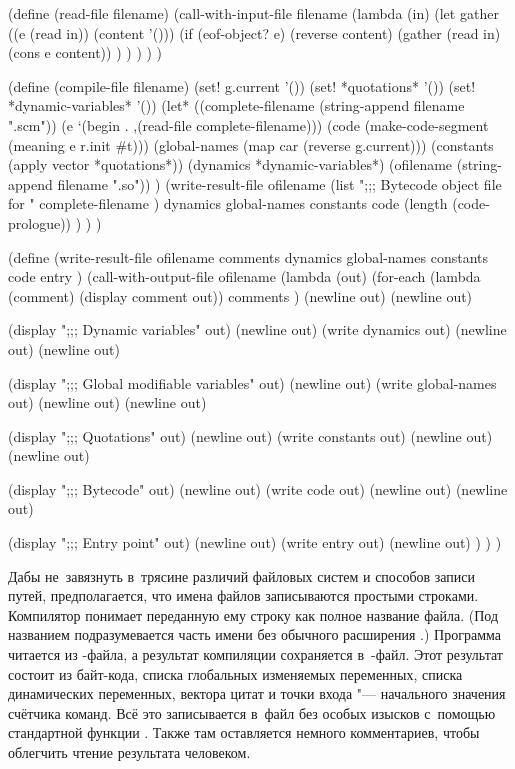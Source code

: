 \begin{code:lisp}
(define (read-file filename)
  (call-with-input-file filename
    (lambda (in)
      (let gather ((e (read in)) (content '()))
        (if (eof-object? e)
            (reverse content)
            (gather (read in) (cons e content)) ) ) ) ) )

(define (compile-file filename)
  (set! g.current '())
  (set! *quotations* '())
  (set! *dynamic-variables* '())
  (let* ((complete-filename (string-append filename ".scm"))
         (e                 `(begin . ,(read-file complete-filename)))
         (code              (make-code-segment (meaning e r.init #t)))
         (global-names      (map car (reverse g.current)))
         (constants         (apply vector *quotations*))
         (dynamics          *dynamic-variables*)
         (ofilename         (string-append filename ".so")) )
    (write-result-file ofilename
                       (list ";;; Bytecode object file for "
                             complete-filename )
                       dynamics global-names constants code
                       (length (code-prologue)) ) ) )

(define (write-result-file ofilename comments dynamics
                           global-names constants code entry )
  (call-with-output-file ofilename
    (lambda (out)
      (for-each (lambda (comment) (display comment out))
                comments ) (newline out) (newline out)
      
      (display ";;; Dynamic variables" out) (newline out)
      (write dynamics out) (newline out) (newline out)
      
      (display ";;; Global modifiable variables" out) (newline out)
      (write global-names out) (newline out) (newline out)
      
      (display ";;; Quotations" out) (newline out)
      (write constants out) (newline out) (newline out)
      
      (display ";;; Bytecode" out) (newline out)
      (write code out) (newline out) (newline out)
      
      (display ";;; Entry point" out) (newline out)
      (write entry out) (newline out) ) ) )
\end{code:lisp}

Дабы не~завязнуть в~трясине различий файловых систем и способов записи путей,
предполагается, что имена файлов записываются простыми строками. Компилятор
понимает переданную ему строку как полное название файла. (Под названием
подразумевается часть имени без обычного расширения .) Программа
читается из -файла, а результат компиляции сохраняется
в~-файл. Этот результат состоит из байт-кода, списка глобальных
изменяемых переменных, списка динамических переменных, вектора цитат и точки
входа "--- начального значения счётчика команд. Всё это записывается в~файл без
особых изысков с~помощью стандартной функции . Также там оставляется
немного комментариев, чтобы облегчить чтение результата человеком.

